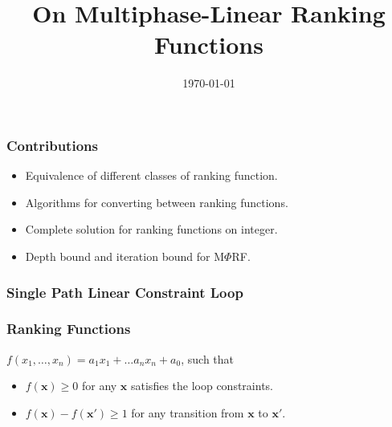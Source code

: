 \documentclass[11pt]{beamer}
\title{On Multiphase-Linear Ranking Functions}
\date{\today}
\begin{document}
\maketitle

\begin{frame}\frametitle{Contributions}
\begin{itemize}
\item Equivalence of different classes of ranking function.

\item Algorithms for converting between ranking functions.

\item Complete solution for ranking functions on integer.

\item Depth bound and iteration bound for M$\Phi$RF.

\end{itemize}
\end{frame}

\begin{frame}\frametitle{Single Path Linear Constraint Loop}
\begin{example}



\end{example}

\begin{definition}[SLC]



\end{definition}

\end{frame}

\begin{frame}\frametitle{Ranking Functions}

\begin{definition}

$f(x_1, \ldots, x_n) = a_1x_1 + \ldots a_nx_n + a_0$, such that

\begin{itemize}
\item $f(\textbf{x}) \ge 0$ for any $\textbf{x}$ satisfies the loop constraints.

\item $f(\textbf{x}) - f(\textbf{x}') \ge 1$ for any transition from $\textbf{x}$ to $\textbf{x}'$.



\end{itemize}
\end{definition}

\begin{example}


\end{example}

\end{frame}
\end{document}
